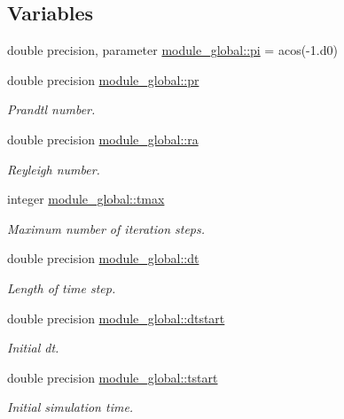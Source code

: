 \subsection*{Variables}
\begin{DoxyCompactItemize}
\item 
double precision, parameter \mbox{\hyperlink{namespacemodule__global_a66e6463e364229164be93ec6fd01a19e}{module\+\_\+global\+::pi}} = acos(-\/1.d0)
\item 
double precision \mbox{\hyperlink{namespacemodule__global_a86b749c501ce7838e1a47aef3b963ddc}{module\+\_\+global\+::pr}}
\begin{DoxyCompactList}\small\item\em Prandtl number. \end{DoxyCompactList}\item 
double precision \mbox{\hyperlink{namespacemodule__global_a7256706b4dc44ce0154f5dec61873a45}{module\+\_\+global\+::ra}}
\begin{DoxyCompactList}\small\item\em Reyleigh number. \end{DoxyCompactList}\item 
integer \mbox{\hyperlink{namespacemodule__global_aa2a5d817a73795a7801b3cccd372e9aa}{module\+\_\+global\+::tmax}}
\begin{DoxyCompactList}\small\item\em Maximum number of iteration steps. \end{DoxyCompactList}\item 
double precision \mbox{\hyperlink{namespacemodule__global_a7cd76bf7034f9b1c715f62694cc27471}{module\+\_\+global\+::dt}}
\begin{DoxyCompactList}\small\item\em Length of time step. \end{DoxyCompactList}\item 
double precision \mbox{\hyperlink{namespacemodule__global_a5d6f695d6a4af07b0334c3b4e609a527}{module\+\_\+global\+::dtstart}}
\begin{DoxyCompactList}\small\item\em Initial dt. \end{DoxyCompactList}\item 
double precision \mbox{\hyperlink{namespacemodule__global_a9adeb19eb4726dcc57576c2dbc89297b}{module\+\_\+global\+::tstart}}
\begin{DoxyCompactList}\small\item\em Initial simulation time. \end{DoxyCompactList}\item 

\end{DoxyCompactItemize}

